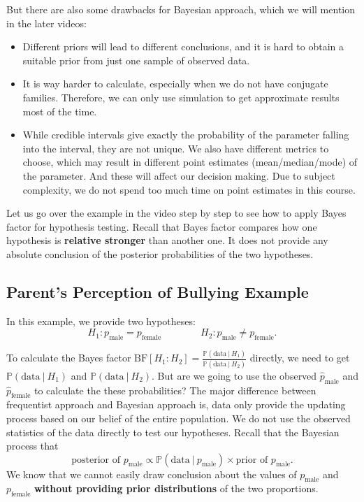 \documentclass{article}
\def\dsst{\displaystyle}
\begin{document}
But there are also some drawbacks for Bayesian approach, which we will mention in the later videos:
\begin{itemize}
	\item Different priors will lead to different conclusions, and it is hard to obtain a suitable prior from just one sample of observed data. 
	
	\item It is way harder to calculate, especially when we do not have conjugate families. Therefore, we can only use simulation to get approximate results most of the time.
	
	\item While credible intervals give exactly the probability of the parameter falling into the interval, they are not unique. We also have different metrics to choose, which may result in different point estimates (mean/median/mode) of the parameter. And these will affect our decision making. Due to subject complexity, we do not spend too much time on point estimates in this course. 
\end{itemize}

Let us go over the example in the video step by step to see how to apply Bayes factor for hypothesis testing. Recall that Bayes factor compares how one hypothesis is \textbf{relative stronger} than another one. It does not provide any absolute conclusion of the posterior probabilities of the two hypotheses.

\subsection{Parent's Perception of Bullying Example}

In this example, we provide two hypotheses:
$$ H_1: p_\text{male} = p_\text{female}\qquad \qquad H_2:p_\text{male} \neq p_\text{female}. $$

To calculate the Bayes factor $\text{BF}[H_1:H_2] = \dsst \frac{\mathbb{P}(\text{data}~|~H_1)}{\mathbb{P}(\text{data}~|~H_2)}$ directly, we need to get $\mathbb{P}(\text{data}~|~H_1)$ and $\mathbb{P}(\text{data}~|~H_2)$. But are we going to use the observed $\hat{p}_\text{male}$ and $\hat{p}_\text{female}$ to calculate the these probabilities? The major difference between frequentist approach and Bayesian approach is, data only provide the updating process based on our belief of the entire population. We do not use the observed statistics of the data directly to test our hypotheses. Recall that the Bayesian process that
$$ \text{posterior of $p_\text{male}$} \propto \mathbb{P}(\text{data}~|~p_\text{male}) \times \text{prior of $p_\text{male}$}. $$
We know that we cannot easily draw conclusion about the values of $p_\text{male}$ and $p_\text{female}$ \textbf{without providing prior distributions} of the two proportions.\\
\end{document}
